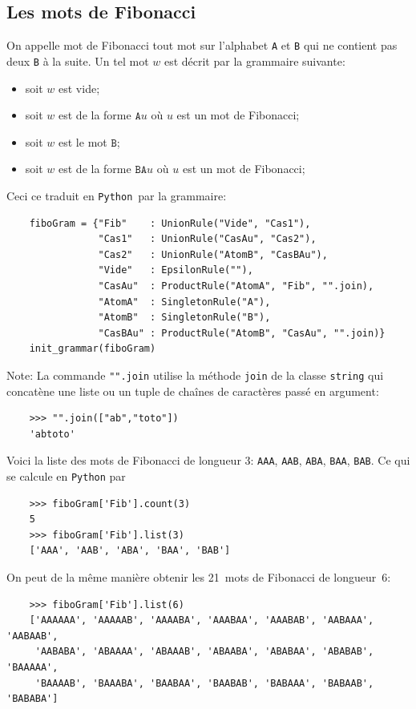 \documentclass[11pt]{article}
\newcommand{\Python}{\texttt{Python}}
\begin{document}
\subsection{Les mots de Fibonacci}

On appelle mot de Fibonacci tout mot sur l'alphabet \texttt{A} et \texttt{B}
qui ne contient pas deux \texttt{B} à la suite. Un tel mot $w$ est décrit par
la grammaire suivante:
\begin{itemize}
\item soit $w$ est vide;
\item soit $w$ est de la forme $\texttt{A} u$ où $u$ est un mot de Fibonacci;
\item soit $w$ est le mot $\texttt{B}$;
\item soit $w$ est de la forme $\texttt{B} \texttt{A} u$ où $u$ est un mot de Fibonacci;
\end{itemize}
Ceci ce traduit en \Python\ par la grammaire:
\begin{verbatim}
    fiboGram = {"Fib"    : UnionRule("Vide", "Cas1"),
                "Cas1"   : UnionRule("CasAu", "Cas2"),
                "Cas2"   : UnionRule("AtomB", "CasBAu"),
                "Vide"   : EpsilonRule(""),
                "CasAu"  : ProductRule("AtomA", "Fib", "".join),
                "AtomA"  : SingletonRule("A"),
                "AtomB"  : SingletonRule("B"),
                "CasBAu" : ProductRule("AtomB", "CasAu", "".join)}
    init_grammar(fiboGram)
\end{verbatim}
Note: La commande \verb+"".join+ utilise la méthode \texttt{join} de la classe
\texttt{string} qui concatène une liste ou un tuple de chaînes de caractères
passé en argument:
\begin{verbatim}
    >>> "".join(["ab","toto"])
    'abtoto'
\end{verbatim}
Voici la liste des mots de Fibonacci de longueur 3: \texttt{AAA},
\texttt{AAB}, \texttt{ABA}, \texttt{BAA}, \texttt{BAB}.  Ce qui se calcule en
\Python{} par
\begin{verbatim}
    >>> fiboGram['Fib'].count(3)
    5
    >>> fiboGram['Fib'].list(3)
    ['AAA', 'AAB', 'ABA', 'BAA', 'BAB']
\end{verbatim}
On peut de la même manière obtenir les 21~mots de Fibonacci de longueur~6:
\begin{verbatim}
    >>> fiboGram['Fib'].list(6)
    ['AAAAAA', 'AAAAAB', 'AAAABA', 'AAABAA', 'AAABAB', 'AABAAA', 'AABAAB', 
     'AABABA', 'ABAAAA', 'ABAAAB', 'ABAABA', 'ABABAA', 'ABABAB', 'BAAAAA', 
     'BAAAAB', 'BAAABA', 'BAABAA', 'BAABAB', 'BABAAA', 'BABAAB', 'BABABA']
\end{verbatim}
\end{document}
